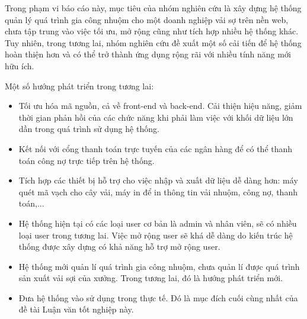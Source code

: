 Trong phạm vi báo cáo này, mục tiêu của nhóm nghiên cứu là xây dựng hệ thống quản lý quá trình gia công nhuộm cho một doanh nghiệp vải sợ trên nền web, chưa tập trung vào việc tối ưu, mở rộng cũng như tích hợp nhiều hệ thống khác. Tuy nhiên, trong tương lai, nhóm nghiên cứu đề xuất một số cải tiến để hệ thống hoàn thiện hơn và có thể trở thành
ứng dụng rộng rãi với nhiều tính năng mới hữu ích.\par

Một số hướng phát triển trong tương lai:
\begin{itemize}
    \item Tối ưu hóa mã nguồn, cả về front-end và back-end. Cải thiện hiệu năng, giảm thời gian phản hồi của các chức năng khi phải làm việc với khối dữ liệu lớn dần trong quá trình sử dụng hệ thống.
    \item Kết nối với cổng thanh toán trực tuyến của các ngân hàng để có thể thanh toán công nợ trực tiếp trên hệ thống.
    \item Tích hợp các thiết bị hỗ trợ cho việc nhập và xuất dữ liệu dễ dàng hơn: máy quét mã vạch cho cây vải, máy in để in thông tin vải nhuộm, công nợ, thanh toán,...
    \item Hệ thống hiện tại có các loại user cơ bản là admin và nhân viên, sẽ có nhiều loại user trong tương lai. Việc mở rộng user sẽ khá dễ dàng do kiến trúc hệ thống được xây dựng có khả năng hỗ trợ mở rộng user.
    \item Hệ thống mới quản lí quá trình gia công nhuộm, chưa quản lí được quá trình sản xuất vải sợi của xưởng. Trong tương lai, đó là hướng phát triển mới.
    \item Đưa hệ thống vào sử dụng trong thực tế. Đó là mục đích cuối cùng nhất của đề tài Luận văn tốt nghiệp này.
\end{itemize}
